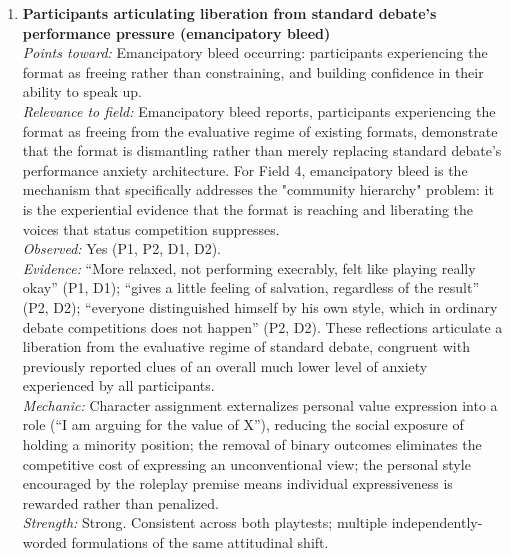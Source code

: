 \begin{enumerate}
\item \textbf{Participants articulating liberation from standard debate's performance pressure (emancipatory bleed)}\\
\textit{Points toward:} Emancipatory bleed occurring: participants experiencing the format as freeing rather than constraining, and building confidence in their ability to speak up.\\
\textit{Relevance to field:} Emancipatory bleed reports, participants experiencing the format as freeing from the evaluative regime of existing formats, demonstrate that the format is dismantling rather than merely replacing standard debate's performance anxiety architecture. For Field 4, emancipatory bleed is the mechanism that specifically addresses the "community hierarchy" problem: it is the experiential evidence that the format is reaching and liberating the voices that status competition suppresses.\\
\textit{Observed:} Yes (P1, P2, D1, D2).\\
\textit{Evidence:} ``More relaxed, not performing execrably, felt like playing really okay'' (P1, D1); ``gives a little feeling of salvation, regardless of the result'' (P2, D2); ``everyone distinguished himself by his own style, which in ordinary debate competitions does not happen'' (P2, D2). These reflections articulate a liberation from the evaluative regime of standard debate, congruent with previously reported clues of an overall much lower level of anxiety experienced by all participants.\\
\textit{Mechanic:} Character assignment externalizes personal value expression into a role (``I am arguing for the value of X''), reducing the social exposure of holding a minority position; the removal of binary outcomes eliminates the competitive cost of expressing an unconventional view; the personal style encouraged by the roleplay premise means individual expressiveness is rewarded rather than penalized.\\
\textit{Strength:} Strong. Consistent across both playtests; multiple independently-worded formulations of the same attitudinal shift.


\end{enumerate}
